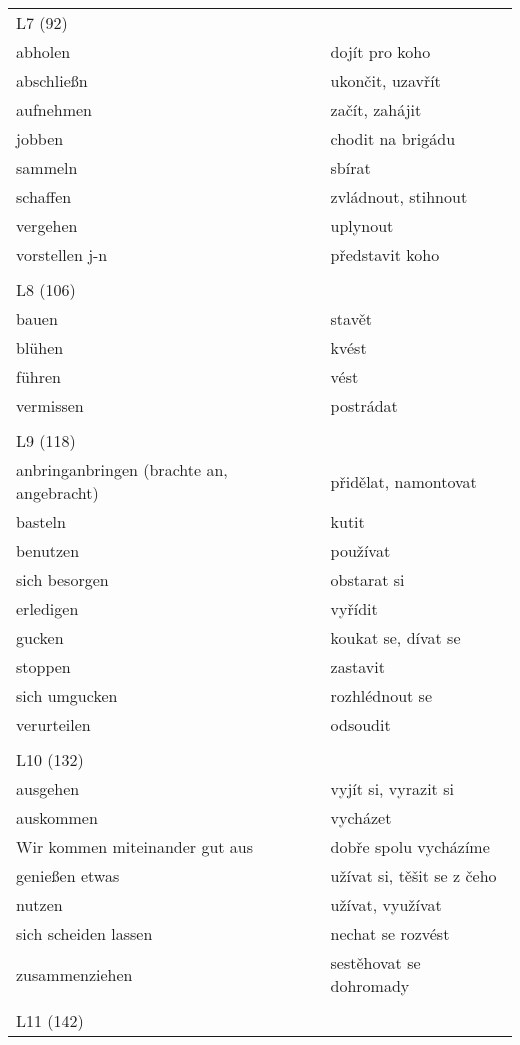 \documentclass{article}
\begin{document}
   \begin{tabular}{ p{5cm}|p{5cm}  }
    L7 (92) \\
    abholen & dojít pro koho \\
    abschlie{\ss}n & ukončit, uzavřít \\
    aufnehmen & začít, zahájit \\
    jobben & chodit na brigádu \\
    sammeln & sbírat \\
    schaffen & zvládnout, stihnout \\
    vergehen & uplynout \\
    vorstellen j-n& představit koho \\
    \\
    L8 (106) \\
    bauen & stavět \\
    blühen & kvést \\
    führen & vést \\
    vermissen & postrádat \\
    \\
    L9 (118) \\
    anbringanbringen (brachte an, angebracht) & přidělat, namontovat \\
    basteln & kutit \\
    benutzen & používat \\
    sich besorgen & obstarat si \\
    erledigen & vyřídit \\
    gucken & koukat se, dívat se \\
    stoppen & zastavit \\
    sich umgucken & rozhlédnout se \\
    verurteilen & odsoudit \\
    \\
    L10 (132) \\
    ausgehen & vyjít si, vyrazit si \\
    auskommen & vycházet \\
    Wir kommen miteinander gut aus & dobře spolu vycházíme \\
    genie{\ss}en etwas & užívat si, těšit se z čeho \\
    nutzen & užívat, využívat \\
    sich scheiden lassen & nechat se rozvést \\
    zusammenziehen & sestěhovat se dohromady \\
    \\
    L11 (142) \\

\end{tabular}
\end{document}
